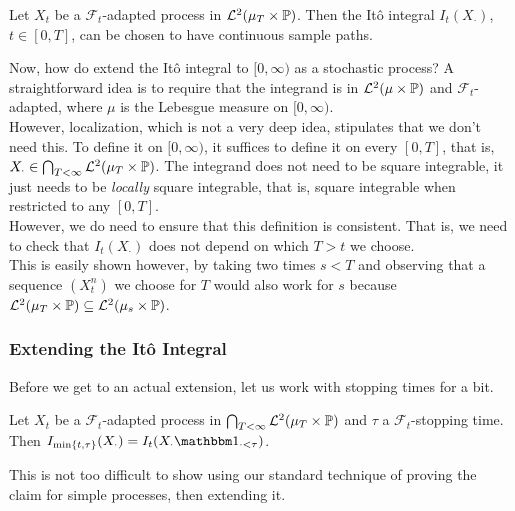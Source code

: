 \begin{lemma}
	Let $X_t$ be a $\mathcal{F}_t$-adapted process in $\mathcal{L}^2(\mu_T\times\mathbb{P})$. Then the It\^{o} integral $I_t(X_\cdot)$, $t\in[0,T]$, can be chosen to have continuous sample paths.
\end{lemma}

Now, how do extend the It\^{o} integral to $[0,\infty)$ as a stochastic process? A straightforward idea is to require that the integrand is in $\mathcal{L}^2(\mu\times\mathbb{P})$ and $\mathcal{F}_t$-adapted, where $\mu$ is the Lebesgue measure on $[0,\infty)$.\\
However, localization, which is not a very deep idea, stipulates that we don't need this. To define it on $[0,\infty)$, it suffices to define it on every $[0,T]$, that is, $X_\cdot \in \bigcap_{T < \infty} \mathcal{L}^2(\mu_T\times\mathbb{P})$. The integrand does not need to be square integrable, it just needs to be \textit{locally} square integrable, that is, square integrable when restricted to any $[0,T]$.\\
However, we do need to ensure that this definition is consistent. That is, we need to check that $I_t(X_\cdot)$ does not depend on which $T>t$ we choose.\\

This is easily shown however, by taking two times $s<T$ and observing that a sequence $(X_t^n)$ we choose for $T$ would also work for $s$ because $\mathcal{L}^2(\mu_T\times\mathbb{P})\subseteq\mathcal{L}^2(\mu_s\times\mathbb{P})$.

\subsubsection{Extending the It\^{o} Integral}

Before we get to an actual extension, let us work with stopping times for a bit.

\begin{lemma}
	Let $X_t$ be a $\mathcal{F}_t$-adapted process in $\bigcap_{T<\infty} \mathcal{L}^2(\mu_T\times\mathbb{P})$ and $\tau$ a $\mathcal{F}_t$-stopping time. Then $I_{\min\{t,\tau\}}(X_\cdot) = I_t(X_\cdot \indic_{\cdot < \tau})$.
\end{lemma}

This is not too difficult to show using our standard technique of proving the claim for simple processes, then extending it.\\

